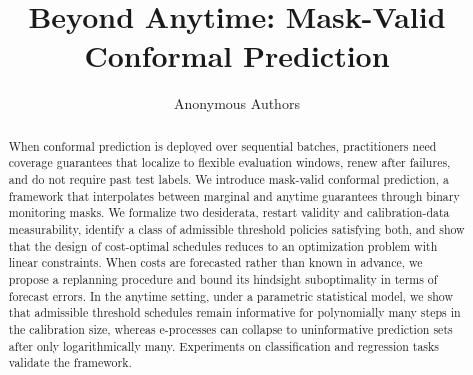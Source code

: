 \documentclass{uai2026} %
\title{Beyond Anytime: Mask-Valid Conformal Prediction}
\author[1]{Anonymous Authors}
\affil[1]{Anonymous Affiliation}
\newcommand{\1}{\mathbf{1}}
\newcommand{\prob}{\mathbb{P}}
\newcommand{\xcal}{\mathcal{X}}
\newcommand{\ycal}{\mathcal{Y}}
\newcommand{\scal}{\mathcal{S}}
\newcommand{\ens}[1]{\left\{#1\right\}}
\newcommand{\cali}{\mathrm{cal}}
\newcommand{\scalcal}{\scal_{\cali}}
\newcommand{\acal}{\mathcal{A}}
\begin{document}
\maketitle

\begin{abstract}
  When conformal prediction is deployed over sequential batches, practitioners need coverage guarantees that localize to flexible evaluation windows, renew after failures, and do not require past test labels. We introduce mask-valid conformal prediction, a framework that interpolates between marginal and anytime guarantees through binary monitoring masks. We formalize two desiderata, restart validity and calibration-data measurability, identify a class of admissible threshold policies satisfying both, and show that the design of cost-optimal schedules reduces to an optimization problem with linear constraints. When costs are forecasted rather than known in advance, we propose a replanning procedure and bound its hindsight suboptimality in terms of forecast errors. In the anytime setting, under a parametric statistical model, we show that admissible threshold schedules remain informative for polynomially many steps in the calibration size, whereas e-processes can collapse to uninformative prediction sets after only logarithmically many. Experiments on classification and regression tasks validate the framework.
\end{abstract}

%


\end{document}
